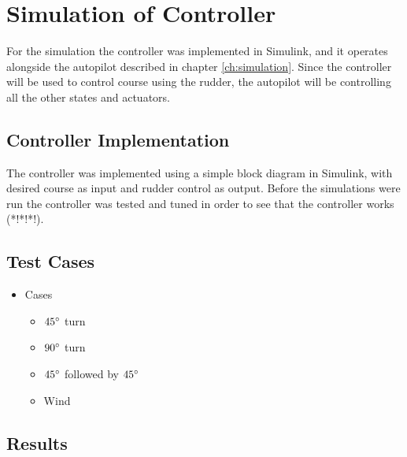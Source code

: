 \section{Simulation of Controller}

For the simulation the controller was implemented in Simulink, and it operates alongside the autopilot described in chapter \ref{ch:simulation}. Since the controller will be used to control course using the rudder, the autopilot will be controlling all the other states and actuators.


\subsection{Controller Implementation}

The controller was implemented using a simple block diagram in Simulink, with desired course as input and rudder control as output. Before the simulations were run the controller was tested and tuned in order to see that the controller works (*!*!*!). 

\subsection{Test Cases}


\begin{itemize}
	\item Cases
	\begin{itemize}
		\item $45\degree$ turn
		\item $90\degree$ turn
		\item $45\degree$ followed by $45\degree$
		\item Wind
	\end{itemize}
\end{itemize}


\subsection{Results}